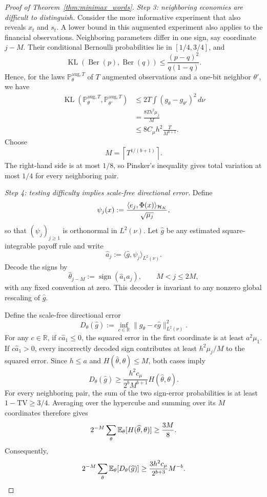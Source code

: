 \begin{proof}[Proof of Theorem~\ref{thm:minimax_words}]
\medskip
\noindent\textit{Step 3: neighboring economies are difficult to distinguish.}
Consider the more informative experiment that also reveals $x_t$ and $s_t$.
A lower bound in this augmented experiment also applies to the financial
observations. Neighboring parameters differ in one sign, say coordinate
$j-M$. Their conditional Bernoulli probabilities lie in $[1/4,3/4]$, and
\[
\operatorname{KL}(\operatorname{Ber}(p),\operatorname{Ber}(q))
\leq
\frac{(p-q)^2}{q(1-q)}.
\]
Hence, for the laws $\mathbb P^{\mathrm{aug},T}_\theta$ of $T$ augmented
observations and a one-bit neighbor $\theta'$, we have
\[
\begin{aligned}
\operatorname{KL}(\mathbb P^{\mathrm{aug},T}_\theta,
                  \mathbb P^{\mathrm{aug},T}_{\theta'})
&\leq
2T\int(g_\theta-g_{\theta'})^2\,d\nu\\
&=
\frac{8Th^2\mu_j}{M}\\
&\leq
8C_\mu h^2\frac{T}{M^{b+1}}.
\end{aligned}
\]
Choose
\[
M=\left\lceil T^{1/(b+1)}\right\rceil.
\]
The right-hand side is at most $1/8$, so Pinsker's inequality gives total
variation at most $1/4$ for every neighboring pair.

\medskip
\noindent\textit{Step 4: testing difficulty implies scale-free directional error.}
Define
\[
\psi_j(x)
:=
\frac{\langle e_j,\Phi(x)\rangle_{\mathcal{H}_K}}{\sqrt{\mu_j}},
\]
so that $(\psi_j)_{j\geq1}$ is orthonormal in $L^2(\nu)$. Let $\widehat g$
be any estimated square-integrable payoff rule and write
\[
\widehat a_j
:=
\langle\widehat g,\psi_j\rangle_{L^2(\nu)}.
\]
Decode the signs by
\[
\widehat\theta_{j-M}
:=
\operatorname{sign}(\widehat a_1\widehat a_j),
\qquad M<j\leq2M,
\]
with any fixed convention at zero. This decoder is invariant to any nonzero
global rescaling of $\widehat g$.

Define the scale-free directional error
\[
D_\theta(\widehat g)
:=
\inf_{c\in\mathbb R}
\|g_\theta-c\widehat g\|_{L^2(\nu)}^2.
\]
For any $c\in\mathbb R$, if $c\widehat a_1\leq0$, the squared error in the
first coordinate is at least $a^2\mu_1$. If $c\widehat a_1>0$, every
incorrectly decoded sign contributes at least $h^2\mu_j/M$ to the squared
error. Since $h\leq a$ and $H(\widehat\theta,\theta)\leq M$, both cases
imply
\[
D_\theta(\widehat g)
\geq
\frac{h^2c_\mu}{2^bM^{b+1}}
H(\widehat\theta,\theta).
\]
For every neighboring pair, the sum of the two sign-error probabilities is at
least $1-\mathrm{TV}\geq3/4$. Averaging over the hypercube and summing over
its $M$ coordinates therefore gives
\[
2^{-M}\sum_\theta
\mathbb{E}_\theta[H(\widehat\theta,\theta)]
\geq
\frac{3M}{8}.
\]
Consequently,
\[
2^{-M}\sum_\theta
\mathbb{E}_\theta[D_\theta(\widehat g)]
\geq
\frac{3h^2c_\mu}{2^{b+3}}M^{-b}.
\]


\end{proof}
